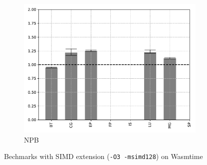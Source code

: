 \begin{figure}
\begin{subfigure}[t]{.45\textwidth}
        \includegraphics[width=\textwidth]
        {Images/6.1.RQ1/npb-wasmtime-simd.pdf}
        \caption{NPB}
    \end{subfigure}
    \caption{Bechmarks with SIMD extension (\texttt{-O3 -msimd128}) on Wasmtime}
    \label{fig:rq1-wasmtime-simd}
\end{figure}


